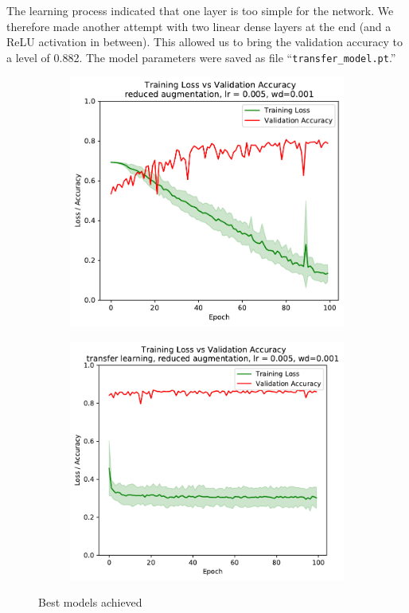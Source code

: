 \documentclass[sigconf,nonacm]{acmart}
\begin{document}
The learning process indicated that one layer is too simple
for the network. We therefore made another attempt with two
linear dense layers at the end (and a ReLU activation in between).
This allowed us to bring the validation accuracy to a level of 0.882.
The model parameters were saved as file ``\texttt{transfer\_model.pt}.''

\begin{figure}[ht]
\begin{subfigure}[c]{0.45\columnwidth}
\includegraphics[width=\textwidth]{plot_best.pdf}
\end{subfigure}
\hspace{2pt}
\begin{subfigure}[c]{0.45\columnwidth}
\includegraphics[width=\textwidth]{plot_transfer.pdf}
\end{subfigure}
\vspace{-.7\baselineskip}
\caption{Best models achieved}
\label{part3:best}
\end{figure}
\end{document}
